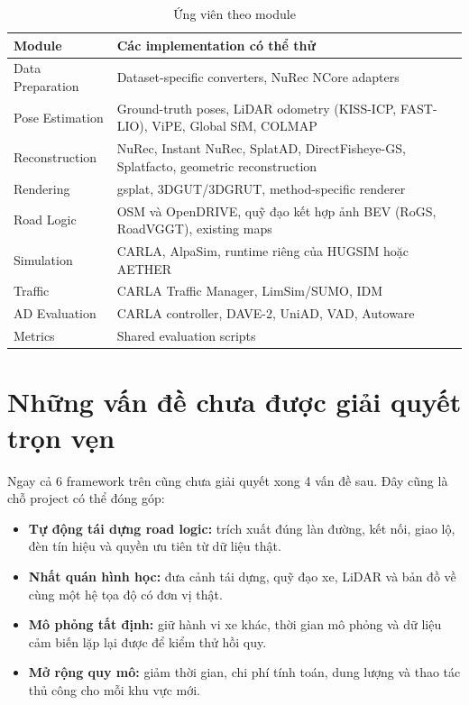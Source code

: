 \begin{table}[H]
  \centering
  \caption{Ứng viên theo module}
  \begin{tabularx}{\linewidth}{l X}
    \toprule
    \textbf{Module} & \textbf{Các implementation có thể thử} \\
    \midrule
    Data Preparation & Dataset-specific converters, NuRec NCore adapters \\
    Pose Estimation & Ground-truth poses, LiDAR odometry (KISS-ICP, FAST-LIO), ViPE, Global SfM, COLMAP \\
    Reconstruction & NuRec, Instant NuRec, SplatAD, DirectFisheye-GS, Splatfacto, geometric reconstruction \\
    Rendering & gsplat, 3DGUT/3DGRUT, method-specific renderer \\
    Road Logic & OSM và OpenDRIVE, quỹ đạo kết hợp ảnh BEV (RoGS, RoadVGGT), existing maps \\
    Simulation & CARLA, AlpaSim, runtime riêng của HUGSIM hoặc AETHER \\
    Traffic & CARLA Traffic Manager, LimSim/SUMO, IDM \\
    AD Evaluation & CARLA controller, DAVE-2, UniAD, VAD, Autoware \\
    Metrics & Shared evaluation scripts \\
    \bottomrule
  \end{tabularx}
\end{table}

\section{Những vấn đề chưa được giải quyết trọn vẹn}

Ngay cả 6 framework trên cũng chưa giải quyết xong 4 vấn đề sau. Đây cũng là chỗ project có thể đóng góp:
\begin{itemize}
  \item \textbf{Tự động tái dựng road logic:} trích xuất đúng làn đường, kết nối, giao lộ, đèn tín hiệu và quyền ưu tiên từ dữ liệu thật.
  \item \textbf{Nhất quán hình học:} đưa cảnh tái dựng, quỹ đạo xe, LiDAR và bản đồ về cùng một hệ tọa độ có đơn vị thật.
  \item \textbf{Mô phỏng tất định:} giữ hành vi xe khác, thời gian mô phỏng và dữ liệu cảm biến lặp lại được để kiểm thử hồi quy.
  \item \textbf{Mở rộng quy mô:} giảm thời gian, chi phí tính toán, dung lượng và thao tác thủ công cho mỗi khu vực mới.
\end{itemize}

